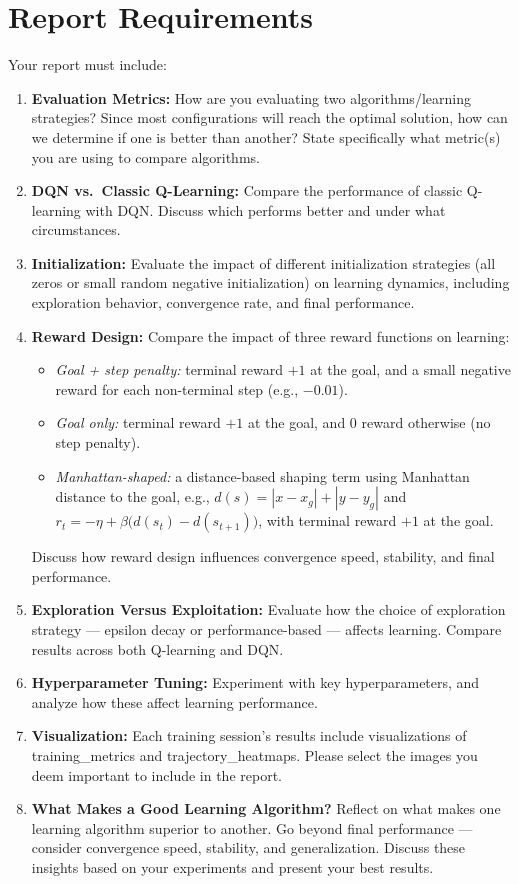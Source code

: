 \documentclass[12pt]{article}
\begin{document}
\section{Report Requirements}
Your report must include:
\begin{enumerate}
  \item \textbf{Evaluation Metrics:} How are you evaluating two algorithms/learning strategies? Since most configurations will reach the optimal solution, how can we determine if one is better than another? State specifically what metric(s) you are using to compare algorithms.
  \item \textbf{DQN vs.\ Classic Q-Learning:} Compare the performance of classic Q-learning with DQN. Discuss which performs better and under what circumstances.
  \item \textbf{Initialization:} Evaluate the impact of different initialization strategies (all zeros or small random negative initialization) on learning dynamics, including exploration behavior, convergence rate, and final performance.
  
  \item \textbf{Reward Design:} Compare the impact of three reward functions on learning:
  \begin{itemize}
    \item \emph{Goal + step penalty:} terminal reward $+1$ at the goal, and a small negative reward for each non-terminal step (e.g., $-0.01$).
    \item \emph{Goal only:} terminal reward $+1$ at the goal, and $0$ reward otherwise (no step penalty).
    \item \emph{Manhattan-shaped:} a distance-based shaping term using Manhattan distance to the goal, e.g., $d(s)=|x-x_g|+|y-y_g|$ and $r_t=-\eta+\beta\bigl(d(s_t)-d(s_{t+1})\bigr)$, with terminal reward $+1$ at the goal.
  \end{itemize}
  Discuss how reward design influences convergence speed, stability, and final performance.
    \item \textbf{Exploration Versus Exploitation:} Evaluate how the choice of exploration strategy --- epsilon decay or performance-based --- affects learning. Compare results across both Q-learning and DQN.
  \item \textbf{Hyperparameter Tuning:} Experiment with key hyperparameters, and analyze how these affect learning performance.
  \item \textbf{Visualization:} Each training session's results include visualizations of training\_metrics and trajectory\_heatmaps. Please select the images you deem important to include in the report.
  \item \textbf{What Makes a Good Learning Algorithm?} Reflect on what makes one learning algorithm superior to another. Go beyond final performance --- consider convergence speed, stability, and generalization. Discuss these insights based on your experiments and present your best results.
\end{enumerate}
\end{document}

